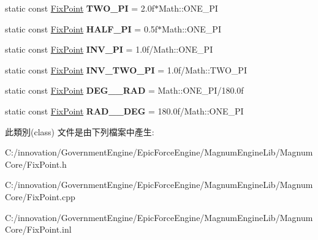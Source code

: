 \begin{DoxyCompactItemize}
\item 
static const \hyperlink{class_i_dream_sky_1_1_fix_point}{Fix\+Point} {\bfseries T\+W\+O\+\_\+\+PI} = 2.\+0f$\ast$\+Math\+::\+O\+N\+E\+\_\+\+PI\hypertarget{class_i_dream_sky_1_1_fix_point_ae1a312518cd87cc1bd139afa01cc717f}{}\label{class_i_dream_sky_1_1_fix_point_ae1a312518cd87cc1bd139afa01cc717f}

\item 
static const \hyperlink{class_i_dream_sky_1_1_fix_point}{Fix\+Point} {\bfseries H\+A\+L\+F\+\_\+\+PI} = 0.\+5f$\ast$\+Math\+::\+O\+N\+E\+\_\+\+PI\hypertarget{class_i_dream_sky_1_1_fix_point_a458b935a39b4ee1a4a0d215d72c9a6b3}{}\label{class_i_dream_sky_1_1_fix_point_a458b935a39b4ee1a4a0d215d72c9a6b3}

\item 
static const \hyperlink{class_i_dream_sky_1_1_fix_point}{Fix\+Point} {\bfseries I\+N\+V\+\_\+\+PI} = 1.\+0f/\+Math\+::\+O\+N\+E\+\_\+\+PI\hypertarget{class_i_dream_sky_1_1_fix_point_ac8a446acfb2a1e58ace34e3e2b14aa32}{}\label{class_i_dream_sky_1_1_fix_point_ac8a446acfb2a1e58ace34e3e2b14aa32}

\item 
static const \hyperlink{class_i_dream_sky_1_1_fix_point}{Fix\+Point} {\bfseries I\+N\+V\+\_\+\+T\+W\+O\+\_\+\+PI} = 1.\+0f/\+Math\+::\+T\+W\+O\+\_\+\+PI\hypertarget{class_i_dream_sky_1_1_fix_point_ab187ff861300f3dbee673372900c6c0b}{}\label{class_i_dream_sky_1_1_fix_point_ab187ff861300f3dbee673372900c6c0b}

\item 
static const \hyperlink{class_i_dream_sky_1_1_fix_point}{Fix\+Point} {\bfseries D\+E\+G\+\_\+\_\+\+R\+AD} = Math\+::\+O\+N\+E\+\_\+\+PI/180.\+0f\hypertarget{class_i_dream_sky_1_1_fix_point_a9db4ab48ca53efa93f9546ab4a4a75ef}{}\label{class_i_dream_sky_1_1_fix_point_a9db4ab48ca53efa93f9546ab4a4a75ef}

\item 
static const \hyperlink{class_i_dream_sky_1_1_fix_point}{Fix\+Point} {\bfseries R\+A\+D\+\_\+\_\+\+D\+EG} = 180.\+0f/\+Math\+::\+O\+N\+E\+\_\+\+PI\hypertarget{class_i_dream_sky_1_1_fix_point_a4e1c145878e25a401516dc00243fb631}{}\label{class_i_dream_sky_1_1_fix_point_a4e1c145878e25a401516dc00243fb631}

\end{DoxyCompactItemize}


此類別(class) 文件是由下列檔案中產生\+:\begin{DoxyCompactItemize}
\item 
C\+:/innovation/\+Government\+Engine/\+Epic\+Force\+Engine/\+Magnum\+Engine\+Lib/\+Magnum\+Core/Fix\+Point.\+h\item 
C\+:/innovation/\+Government\+Engine/\+Epic\+Force\+Engine/\+Magnum\+Engine\+Lib/\+Magnum\+Core/Fix\+Point.\+cpp\item 
C\+:/innovation/\+Government\+Engine/\+Epic\+Force\+Engine/\+Magnum\+Engine\+Lib/\+Magnum\+Core/Fix\+Point.\+inl\end{DoxyCompactItemize}
